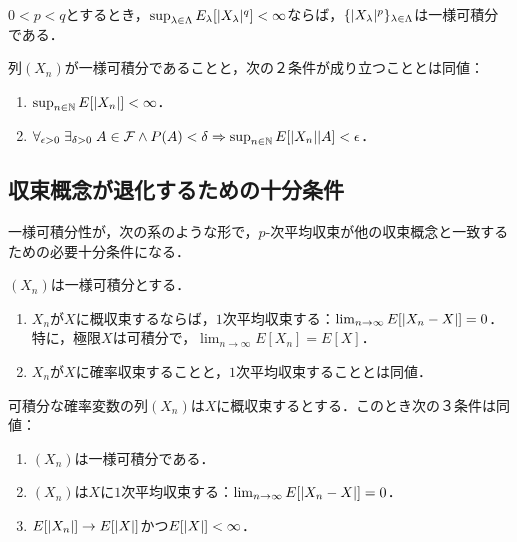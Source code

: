 \documentclass[uplatex,dvipdfmx]{jsreport}
\begin{document}
\begin{corollary}
    $0<p<q$とするとき，$\sup_{\lambda\in\Lambda}E_\lambda[\lvert X_\lambda\rvert^q]<\infty$ならば，$\{\lvert X_\lambda\rvert^p\}_{\lambda\in\Lambda}$は一様可積分である．
\end{corollary}

\begin{lemma}[一様可積分性の特徴付け]
    列$(X_n)$が一様可積分であることと，次の２条件が成り立つこととは同値：
    \begin{enumerate}
        \item $\sup_{n\in\mathbb{N}}E[\lvert X_n\rvert]<\infty$．
        \item $\forall_{\epsilon>0}\;\exists_{\delta>0}\;A\in\mathcal{F}\land P(A)<\delta\Rightarrow\sup_{n\in\mathbb{N}}E[\lvert X_n\rvert|A]<\epsilon$．
    \end{enumerate}
\end{lemma}

\subsection{収束概念が退化するための十分条件}

\begin{tcolorbox}[colframe=ForestGreen, colback=ForestGreen!10!white,breakable,colbacktitle=ForestGreen!40!white,coltitle=black,fonttitle=\bfseries\sffamily,
title=]
    一様可積分性が，次の系のような形で，$p$-次平均収束が他の収束概念と一致するための必要十分条件になる．
\end{tcolorbox}

\begin{theorem}[一般化されたLebesgueの優収束定理]
    $(X_n)$は一様可積分とする．
    \begin{enumerate}
        \item $X_n$が$X$に概収束するならば，$1$次平均収束する：$\lim_{n\to\infty}E[\lvert X_n-X\rvert]=0$．
        特に，極限$X$は可積分で，$\lim_{n\to\infty}E[X_n]=E[X]$．
        \item $X_n$が$X$に確率収束することと，$1$次平均収束することとは同値．
    \end{enumerate}
\end{theorem}

\begin{corollary}[一様可積分性の特徴付け]
    可積分な確率変数の列$(X_n)$は$X$に概収束するとする．このとき次の３条件は同値：
    \begin{enumerate}
        \item $(X_n)$は一様可積分である．
        \item $(X_n)$は$X$に$1$次平均収束する：$\lim_{n\to\infty}E[\lvert X_n-X\rvert]=0$．
        \item $E[\lvert X_n\rvert]\to E[\lvert X\rvert]$かつ$E[\lvert X\rvert]<\infty$．
    \end{enumerate}
\end{corollary}
\end{document}
